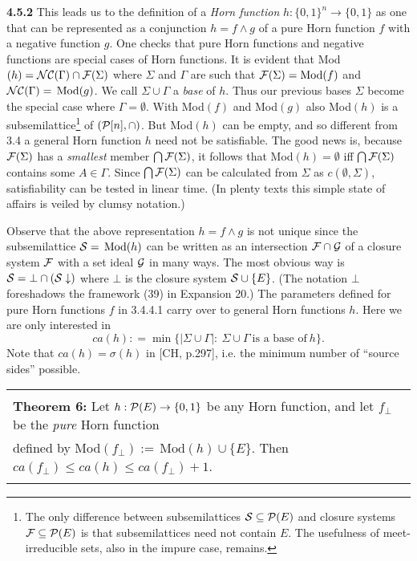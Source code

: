 \documentclass[11pt]{article}
\newcommand{\ra}{\rightarrow}
\begin{document}
{\bf 4.5.2} This leads us to the definition of a {\it Horn function} $h: \{0,1\}^n \ra \{0,1\}$ as one that can be represented as a conjunction $h = f \wedge g$ of a pure Horn function $f$ with a negative function $g$. One checks that pure Horn functions and negative functions are special cases of Horn functions. It is evident that Mod$(h) = {\cal N}{\cal C}(\Gamma) \cap {\cal F}(\Sigma)$ where $\Sigma$ and $\Gamma$ are such that ${\cal F}(\Sigma)= \mbox{Mod}(f)$ and ${\cal N}{\cal C}(\Gamma) = \, \mbox{Mod}(g)$.  
We call $\Sigma \cup \Gamma$ a {\it base} of $h$. Thus our previous bases $\Sigma$ become the special case where $\Gamma = \emptyset$. With Mod$(f)$ and Mod$(g)$ also Mod$(h)$ is a subsemilattice\footnote{The only difference between subsemilattices ${\cal S} \subseteq {\cal P}(E)$ and closure systems ${\cal F} \subseteq {\cal P}(E)$ is that subsemilattices need not contain $E$. The usefulness of meet-irreducible sets, also in the impure case, remains.} of $({\cal P}[n], \cap )$. But Mod$(h)$ can be empty, and so different from 3.4 a general Horn function $h$ need not be satisfiable. The good news is, because ${\cal F}(\Sigma)$ has a {\it smallest} member $\bigcap {\cal F}(\Sigma)$, it follows that Mod$(h) = \emptyset$ iff $\bigcap {\cal F}(\Sigma)$ contains some $A \in \Gamma$. Since $\bigcap {\cal F}(\Sigma)$ can be calculated from $\Sigma$ as $c(\emptyset, \Sigma)$, satisfiability can be tested in linear time. (In plenty texts this simple state of affairs is veiled by clumsy notation.)


Observe that the above representation $h= f\wedge g$ is not unique since the subsemilattice ${\cal S} = \,\mbox{Mod}(h)$ can be written as an intersection ${\cal F} \cap {\cal G}$ of a closure system ${\cal F}$ with a set ideal ${\cal G}$ in many ways. The most obvious way is ${\cal S} = \bot \cap ({\cal S} \downarrow )$ where $\bot$ is the closure system ${\cal S} \cup \{E\}$. (The notation $\bot$ foreshadows the framework (39) in Expansion 20.) 
The parameters defined for pure Horn functions $f$ in 3.4.4.1 carry over to general Horn functions $h$. Here we are only interested in 
$$ca(h): = \min \{|\Sigma  \cup \Gamma |: \ \Sigma \cup \Gamma \ \mbox{is a base of} \ h\}.$$
Note that $ca(h) = \sigma (h)$ in [CH, p.297], i.e. the minimum number of ``source sides'' possible.


\begin{tabular}{|l|} \hline \\
{\bf Theorem 6:} Let $h : {\cal P}(E) \ra \{0,1\}$ be any Horn function, and let $f_\bot$ be the {\it pure} Horn function\\
defined by Mod$(f_\bot) := \, \mbox{Mod}(h) \cup \{E\}$. Then $ca(f_\bot) \leq ca(h) \leq ca(f_\bot) +1$.\\ \\ \hline \end{tabular}
\end{document}
